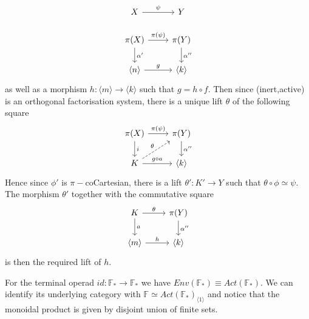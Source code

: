 \begin{remark}
\[\begin{tikzcd}
X \arrow[r, "\psi"]                                 & Y                             \\
\pi(X) \arrow[r, "\pi(\psi)"] \arrow[d, "\alpha '"] & \pi(Y) \arrow[d, "\alpha ''"] \\
\langle n \rangle \arrow[r, "g"]                 & \langle k \rangle            
\end{tikzcd}\] as well as a morphism $h:\langle m \rangle \rightarrow \langle k \rangle$ such that $g=h \circ f $. Then since (inert,active) is an orthogonal factorisation system, there is a unique lift $\theta$ of the following square
\[\begin{tikzcd}
\pi(X) \arrow[d, "i"] \arrow[r, "\pi(\psi)"]         & \pi(Y) \arrow[d, "\alpha''"] \\
K \arrow[r, "g\circ a"] \arrow[ru, "\theta", dashed] & \langle k \rangle           
\end{tikzcd}\]
Hence since $\phi'$ is $\pi-$coCartesian, there is a lift $\theta':K'\rightarrow Y$ such that $\theta\circ \phi\simeq \psi$. The morphism $\theta'$ together with the commutative square 
\[%
\begin{tikzcd}
K \arrow[r, "\theta"] \arrow[d, "a"] & \pi(Y) \arrow[d, "\alpha''"] \\
\langle m \rangle \arrow[r, "h"]     & \langle k \rangle           
\end{tikzcd}\]
is then the required lift of $h$.\label{rmk:cocartesian-lift}
\end{remark}
\begin{example}\label{ex:envelope-of-F}
For the terminal operad $id:\mathbb{F}_*\rightarrow \mathbb{F}_*$ we have \newline $Env(\mathbb{F}_*)\equiv Act(\mathbb{F}_*)$. We can identify its underlying category with $\mathbb{F}\simeq Act(\mathbb{F}_*)_{\langle 1 \rangle}$ and notice that the monoidal product is given by disjoint union of finite sets.
\end{example}

